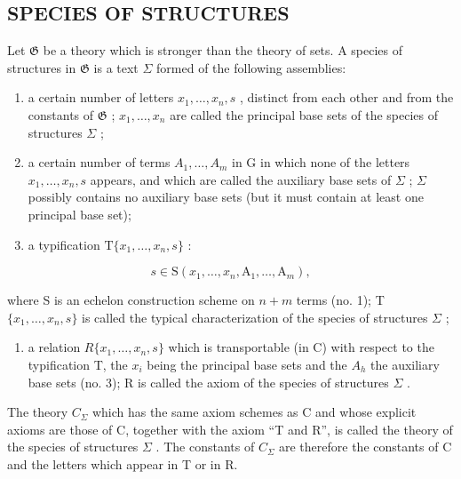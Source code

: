 \subsection{SPECIES OF STRUCTURES}

Let \(\mathfrak{G}\) be a theory which is stronger than the theory of sets. A species of structures in \(\mathfrak{G}\) is a text \(\Sigma\) formed of the following assemblies:

\begin{enumerate}
\def\labelenumi{(\arabic{enumi})}
\item
  a certain number of letters \(x_1, \ldots, x_n, s\) , distinct from each other and from the constants of \(\mathfrak{G}\) ; \(x_1, \ldots, x_n\) are called the principal base sets of the species of structures \(\Sigma\) ;
\item
  a certain number of terms \(A_{1}, \ldots, A_{m}\) in G in which none of the letters \(x_{1}, \ldots, x_{n}, s\) appears, and which are called the auxiliary base sets of \(\Sigma\) ; \(\Sigma\) possibly contains no auxiliary base sets (but it must contain at least one principal base set);
\item
  a typification \(\mathrm{T}\{x_1, \ldots, x_n, s\}\) :
\end{enumerate}

\[
s \in \mathrm{S} (x _ {1}, \dots , x _ {n}, \mathrm{A} _ {1}, \dots , \mathrm{A} _ {m}),
\]

where S is an echelon construction scheme on \(n + m\) terms (no. 1); T \(\{x_{1}, \ldots, x_{n}, s\}\) is called the typical characterization of the species of structures \(\Sigma\) ;

\begin{enumerate}
\def\labelenumi{(\arabic{enumi})}
\setcounter{enumi}{3}
\tightlist
\item
  a relation \(R\{x_{1},\ldots,x_{n},s\}\) which is transportable (in C) with respect to the typification T, the \(x_{i}\) being the principal base sets and the \(A_{h}\) the auxiliary base sets (no. 3); R is called the axiom of the species of structures \(\Sigma\) .
\end{enumerate}

The theory \(C_{\Sigma}\) which has the same axiom schemes as C and whose explicit axioms are those of C, together with the axiom ``T and R'', is called the theory of the species of structures \(\Sigma\) . The constants of \(C_{\Sigma}\) are therefore the constants of C and the letters which appear in T or in R.

